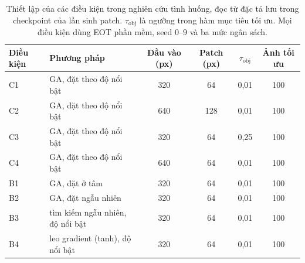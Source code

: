 \begin{table}[t]
\centering\small
\caption{Thiết lập của các điều kiện trong nghiên cứu tình huống, đọc từ đặc tả lưu trong checkpoint của lần sinh patch. $\tau_{\mathrm{obj}}$ là ngưỡng trong hàm mục tiêu tối ưu. Mọi điều kiện dùng EOT phần mềm, seed 0--9 và ba mức ngân sách.}
\label{tab:spec}
\begin{tabular}{@{}llcccc@{}}
\toprule
Điều kiện & Phương pháp & Đầu vào (px) & Patch (px) & $\tau_{\mathrm{obj}}$ & Ảnh tối ưu \\
\midrule
C1 & GA, đặt theo độ nổi bật & 320 & 64 & 0,01 & 100 \\
C2 & GA, đặt theo độ nổi bật & 640 & 128 & 0,01 & 100 \\
C3 & GA, đặt theo độ nổi bật & 320 & 64 & 0,25 & 100 \\
C4 & GA, đặt theo độ nổi bật & 640 & 64 & 0,01 & 100 \\
B1 & GA, đặt ở tâm & 320 & 64 & 0,01 & 100 \\
B2 & GA, đặt ngẫu nhiên & 320 & 64 & 0,01 & 100 \\
B3 & tìm kiếm ngẫu nhiên, độ nổi bật & 320 & 64 & 0,01 & 100 \\
B4 & leo gradient (tanh), độ nổi bật & 320 & 64 & 0,01 & 100 \\
\bottomrule
\end{tabular}
\end{table}
